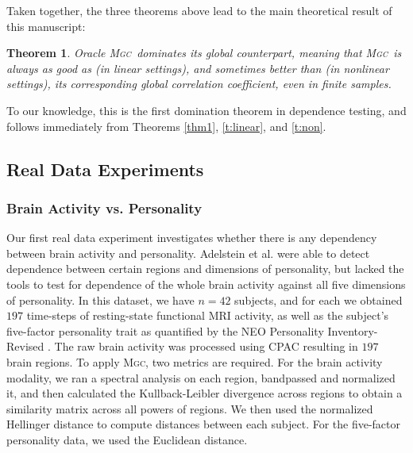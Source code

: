 \documentclass[11pt]{article}
\providecommand{\sct}[1]{{\normalfont\textsc{#1}}}
\newcommand{\Mgc}{\sct{Mgc}}
\newtheorem{thm}{Theorem}
\begin{document}
Taken together, the three theorems above lead to the main theoretical result of this manuscript:
\begin{thm} \label{t:dominate}
Oracle \Mgc~dominates its global counterpart, meaning that \Mgc~is always as good as (in linear settings), and sometimes better than (in nonlinear settings), its corresponding global correlation coefficient, even in finite samples. 
\end{thm}

To our knowledge, this is the first domination theorem in dependence testing, and follows immediately from Theorems \ref{thm1}, \ref{t:linear}, and \ref{t:non}.


\subsection*{Real Data Experiments}
\label{numer3}

\subsubsection*{Brain Activity vs. Personality} %
Our first real data experiment investigates whether there is any dependency between  brain activity and personality.
Adelstein et al. \cite{AdelsteinEtAl2011} were able to detect dependence between certain regions and dimensions of personality, but lacked the tools to test for dependence of the whole brain activity against all five dimensions of personality. 
In this dataset, we have $n=42$ subjects, and for each we obtained  $197$ time-steps of resting-state functional MRI activity, as well as the subject's five-factor personality trait as quantified by  the NEO Personality Inventory-Revised  \cite{Costa1992}. 
The raw brain activity was processed using CPAC \cite{CPAC2015} resulting in $197$ brain regions.
To apply \Mgc, two metrics are required. For the brain activity modality, we ran a spectral analysis on each region, bandpassed and normalized it, and then calculated the Kullback-Leibler divergence across regions to obtain a similarity matrix across all powers of regions.  We then used  the normalized Hellinger distance to compute distances between each subject. 
For the five-factor personality data, we  used the Euclidean distance.
\end{document}
